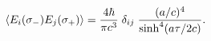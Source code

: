 \begin{equation}\label{viss1}
\langle E_{i}(\sigma _{-}) E_{j}(\sigma _{+}) \rangle = 
{4\hbar\over\pi c^3} \; \delta_{ij} \; 
{(a/c)^4 \over \sinh^4(a \tau/2c)}. 
\hfill\qquad\qquad  
\end{equation}

